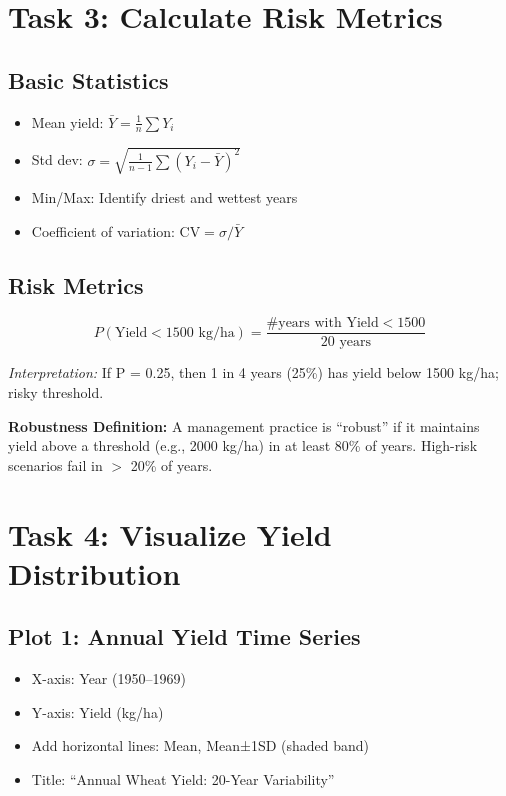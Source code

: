 \section{Task 3: Calculate Risk Metrics}

\subsection{Basic Statistics}

\begin{itemize}
  \item Mean yield: $\bar{Y} = \frac{1}{n} \sum Y_i$
  \item Std dev: $\sigma = \sqrt{\frac{1}{n-1} \sum (Y_i - \bar{Y})^2}$
  \item Min/Max: Identify driest and wettest years
  \item Coefficient of variation: $\text{CV} = \sigma / \bar{Y}$
\end{itemize}

\subsection{Risk Metrics}

\[
P(\text{Yield} < 1500 \text{ kg/ha}) = \frac{\text{\# years with Yield} < 1500}{20 \text{ years}}
\]

\textit{Interpretation:} If P = 0.25, then 1 in 4 years (25\%) has yield below 1500 kg/ha; risky threshold.

\begin{keyconceptbox}
\textbf{Robustness Definition:} A management practice is ``robust'' if it maintains yield above a threshold (e.g., 2000 kg/ha) in at least 80\% of years. High-risk scenarios fail in $>$ 20\% of years.
\end{keyconceptbox}

\section{Task 4: Visualize Yield Distribution}

\subsection{Plot 1: Annual Yield Time Series}

\begin{itemize}
  \item X-axis: Year (1950--1969)
  \item Y-axis: Yield (kg/ha)
  \item Add horizontal lines: Mean, Mean±1SD (shaded band)
  \item Title: ``Annual Wheat Yield: 20-Year Variability''
\end{itemize}

